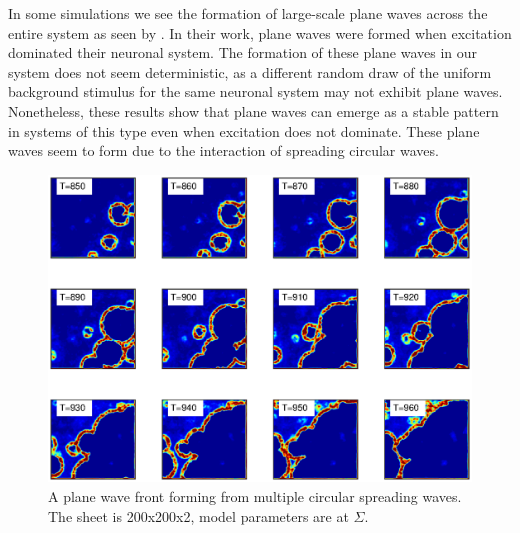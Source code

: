 \FloatBarrier

In some simulations we see the formation of large-scale plane waves across the entire system as seen by \citet{keane2015}.
In their work, plane waves were formed when excitation dominated their neuronal system.
The formation of these plane waves in our system does not seem deterministic, as a different random draw of the uniform background stimulus for the same neuronal system may not exhibit plane waves.
Nonetheless, these results show that plane waves can emerge as a stable pattern in systems of this type even when excitation does not dominate.
These plane waves seem to form due to the interaction of spreading circular waves.
\begin{figure}[!htb]
 \caption{ A plane wave front forming from multiple circular spreading waves.
          The sheet is 200x200x2, model parameters are at $\Sigma$.}
 \label{fig:2D_plane_wave}
 \centering
   \includegraphics[width=\textwidth]{fig/2DPlaneWave}
\end{figure}
\FloatBarrier

